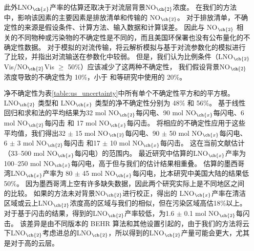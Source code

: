此外LNO$_{\ch{x}}$产率的估算还取决于对流层背景NO$_{\ch{2}}$浓度。
在我们的方法中，影响该因素的主要因素是排放清单和传输的 NO$_{\ch{2}}$。
对于排放清单，不确定性的来源是假设条件、计算方法、输入数据和计算误差。
因此与 NO$_{\ch{2}}$ 相关的不同物种或污染物的不确定性是不同的，而且美国环保署也没有公布量化的不确定性数据。
对于模拟的对流传输，\citet{Li.2018}将云解析模拟与基于对流参数化的模拟进行了比较，并指出对流输送在参数化中较弱。
但是，我们认为比例条件（LNO$_{\ch{2}}$Vis/NO$_{\ch{2}}$Vis $\geq$ 50\%）应该减少了这两种不确定性，
我们假设背景NO$_{\ch{2}}$浓度导致的不确定性为 10\%，小于 \citet{Allen.2019}和\citet{Bucsela.2019}等研究中使用的 20\%。

净不确定性为表\ref{table:us_uncertainty}中所有单个不确定性平方和的平方根。
LNO$_{\ch{2}}$ 类型和 LNO$_{\ch{x}}$ 类型的净不确定性分别为 48\% 和 56\%。
基于线性回归和求和法的平均结果为32 mol NO$_{\ch{2}}$每闪电、90 mol NO$_{\ch{x}}$每闪电、6 mol NO$_{\ch{2}}$每闪击 和 17 mol NO$_{\ch{x}}$每闪击。
将相应的不确定性应用于这些平均值，我们得出32 $\pm$ 15 mol NO$_{\ch{2}}$每闪电、90 $\pm$ 50 mol NO$_{\ch{x}}$每闪电、
6 $\pm$ 3 mol NO$_{\ch{2}}$每闪击 和17 $\pm$ 10 mol NO$_{\ch{x}}$每闪击。
这在当前文献估计（33--500 mol NO$_{\ch{x}}$每闪电）的范围内\citep{Schumann.2007,Beirle.2010,Bucsela.2010}。
最近\citet{Bucsela.2010}研究中估算的LNO$_{\ch{x}}$产率为 100--250 mol NO$_{\ch{x}}$每闪电，高于但与我们的估计结果相重叠。
\citet{Pickering.2016}估算的墨西哥湾LNO$_{\ch{x}}$产率为 80 $\pm$ 45 mol NO$_{\ch{x}}$每闪电，比本研究中美国大陆的结果低50\%。
因为墨西哥湾上空有许多缺失数据，因此两个研究实际上是不同地区之间的比较。
如果\citet{Pickering.2016}的方法未对背景NO$_{\ch{2}}$进行校正，得出的 LNO$_{\ch{x}}$产率在清洁区域或云上LNO$_{\ch{2}}$浓度高的区域与我们的相似，但在污染区域高估18\%以上。
对于基于闪击的结果，\citet{Lapierre.2020}得到的LNO$_{\ch{2}}$产率较低，为1.6 $\pm$ 0.1 mol NO$_{\ch{2}}$每闪击。
该差异是由不同版本的 BEHR 算法和其他设置引起的，由于我们的方法将云下LNO$_{\ch{2}}$考虑进总的LNO$_{\ch{2}}$，所以得到的LNO$_{\ch{2}}$产量可能会更大，尤其是对于高的云层。

